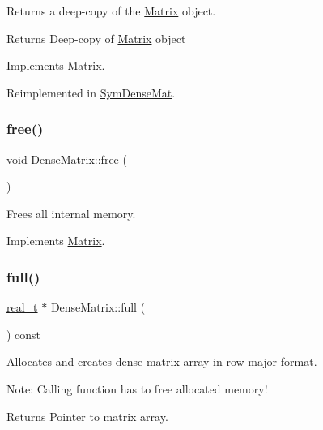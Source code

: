 Returns a deep-\/copy of the \hyperlink{class_matrix}{Matrix} object. \begin{DoxyReturn}{Returns}
Deep-\/copy of \hyperlink{class_matrix}{Matrix} object 
\end{DoxyReturn}


Implements \hyperlink{class_matrix_abf41d80f7392e9d63e9b2fa4b822d3b9}{Matrix}.



Reimplemented in \hyperlink{class_sym_dense_mat_a432a0e30f0440983d32d225759ac9936}{Sym\+Dense\+Mat}.

\mbox{\label{class_dense_matrix_acce63266bde8d6fd4a6c31a78c5e49e8}} 
\subsubsection{\texorpdfstring{free()}{free()}}
{\footnotesize\ttfamily void Dense\+Matrix\+::free (\begin{DoxyParamCaption}{ }\end{DoxyParamCaption})\hspace{0.3cm}{\ttfamily [virtual]}}

Frees all internal memory. 

Implements \hyperlink{class_matrix_ae13ca77389c2eae7b3eba79cb9fefecb}{Matrix}.

\mbox{\label{class_dense_matrix_abde94ef6ed541004e664a655a4bd2e3e}} 
\subsubsection{\texorpdfstring{full()}{full()}}
{\footnotesize\ttfamily \hyperlink{qp_o_a_s_e_s__wrapper_8h_a0d00e2b3dfadee81331bbb39068570c4}{real\+\_\+t} $\ast$ Dense\+Matrix\+::full (\begin{DoxyParamCaption}{ }\end{DoxyParamCaption}) const\hspace{0.3cm}{\ttfamily [virtual]}}

Allocates and creates dense matrix array in row major format.

Note\+: Calling function has to free allocated memory!

\begin{DoxyReturn}{Returns}
Pointer to matrix array. 
\end{DoxyReturn}


